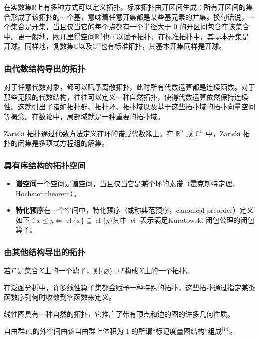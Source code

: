 在实数集$\mathbb{R}$上有多种方式可以定义拓扑。标准拓扑由开区间生成：所有开区间的集合形成了该拓扑的一个基，意味着任意开集都是某些基元素的并集。换句话说，一个集合是开集，当且仅当它的每个点都有一个半径大于 0 的开区间包含在该集合中。更一般地，欧几里得空间$\mathbb{R}^n$也可以赋予拓扑，在标准拓扑中，其基本开集是开球。同样地，复数集$\mathbb{C}$以及$\mathbb{C}^n$也有标准拓扑，其基本开集同样是开球。
\subsubsection{由代数结构导出的拓扑}
对于任意代数对象，都可以赋予离散拓扑，此时所有代数运算都是连续函数。对于那些无限的代数结构，往往可以定义一种自然拓扑，使得代数运算依然保持连续性。这就引出了诸如拓扑群、拓扑环、拓扑域以及基于这些拓扑域的拓扑向量空间等概念。在数论中，局部域就是一种重要的拓扑域。

Zariski 拓扑通过代数方法定义在环的谱或代数簇上。在 $\mathbb{R}^n$ 或 $\mathbb{C}^n$ 中，Zariski 拓扑的闭集是多项式方程组的解集。
\subsubsection{具有序结构的拓扑空间}
\begin{itemize}
\item \textbf{谱空间}一个空间是谱空间，当且仅当它是某个环的素谱（霍克斯特定理，Hochster theorem）。
\item \textbf{特化预序}在一个空间中，特化预序（或称典范预序，canonical preorder）定义如下：$x \leq y \iff \operatorname{cl}\{x\} \subseteq \operatorname{cl}\{y\}$其中 $\operatorname{cl}$ 表示满足Kuratowski 闭包公理的闭包算子。
\end{itemize}
\subsubsection{由其他结构导出的拓扑}

若$\Gamma$ 是集合$X$上的一个滤子，则$\{\varnothing\} \cup \Gamma$构成$X$上的一个拓扑。

在泛函分析中，许多线性算子集都会赋予一种特殊的拓扑，这些拓扑通过指定某类函数序列何时收敛到零函数来定义。

线性图具有一种自然的拓扑，它推广了带有顶点和边的图的许多几何性质。

自由群$F_n$的外空间由该自由群上体积为 1 的所谓“标记度量图结构”组成\(^\text{[14]}\)。
